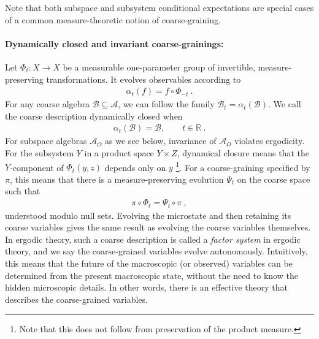 \documentclass[a4paper,11pt]{article}
\theoremstyle{definition}
\newcommand{\mA}{\mathcal{A}}
\newcommand{\mB}{\mathcal{B}}
\begin{document}
Note that both subspace and subsystem conditional expectations are special cases of a common measure-theoretic notion of coarse-graining.

\paragraph{Dynamically closed and invariant coarse-grainings:}
Let $\Phi_t:X\to X$ be a measurable one-parameter group of invertible, measure-preserving transformations. It evolves observables according to
\begin{align}
    \alpha_t(f)=f\circ\Phi_{-t}\ .
\end{align}
For any coarse algebra $\mB\subseteq\mA$, we can follow the family $\mB_t=\alpha_t(\mB)$. We call the coarse description dynamically closed when
\begin{align}\label{eq:classical-coarse-invariance}
    \alpha_t(\mB)=\mB,\qquad t\in\mathbb R\ .
\end{align}
For subspace algebras $\mA_O$ as we see below, invariance of $\mA_O$ violates ergodicity.
For the subsystem $Y$ in a product space $Y\times Z$, dynamical closure means that the $Y$-component of $\Phi_t(y,z)$ depends only on $y$ \footnote{Note that this does not follow from preservation of the product measure.}. For a coarse-graining specified by $\pi$, this means that there is a measure-preserving evolution $\Psi_t$ on the coarse space such that
\begin{align}\label{eq:classical-factor-intertwining}
    \pi\circ\Phi_t=\Psi_t\circ\pi\ ,
\end{align}
understood modulo null sets. Evolving the microstate and then retaining its coarse variables gives the same result as evolving the coarse variables themselves. In ergodic theory, such a coarse description is called a {\it factor system} in ergodic theory, and we say the coarse-grained variables evolve autonomously. Intuitively, this means that the future of the macroscopic (or observed) variables can be determined from the present macroscopic state, without the need to know the hidden microscopic details. In other words, there is an effective theory that describes the coarse-grained variables.



\end{document}
